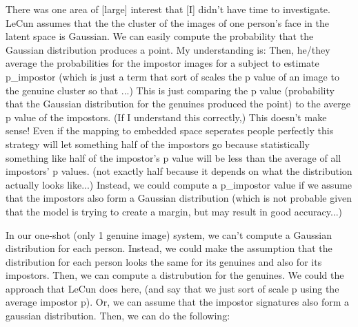 There was one area of [large] interest that [I] didn't have time to investigate.
LeCun assumes that the the cluster of the images of one person's face in the latent space is Gaussian.
We can easily compute the probability that the Gaussian distribution produces a point.
My understanding is:
Then, he/they average the probabilities for the impostor images for a subject to estimate p\_impostor (which is just a term that sort of scales the p value of an image to the genuine cluster so that ...)
This is just comparing the p value (probability that the Gaussian distribution for the genuines produced the point) to the averge p value of the impostors.
(If I understand this correctly,) This doesn't make sense!
Even if the mapping to embedded space seperates people perfectly this strategy will let something half of the impostors go because statistically something like half of the impostor's p value will be less than the average of all impostors' p values.
(not exactly half because it depends on what the distribution actually looks like...)
Instead, we could compute a p\_impostor value if we assume that the impostors also form a Gaussian distribution (which is not probable given that the model is trying to create a margin, but may result in good accuracy...)

In our one-shot (only 1 genuine image) system, we can't compute a Gaussian distribution for each person.
Instead, we could make the assumption that the distribution for each person looks the same for its genuines and also for its impostors.
Then, we can compute a distrubution for the genuines.
We could the approach that LeCun does here, (and say that we just sort of scale p using the average impostor p).
Or, we can assume that the impostor signatures also form a gaussian distribution.
Then, we can do the following:

